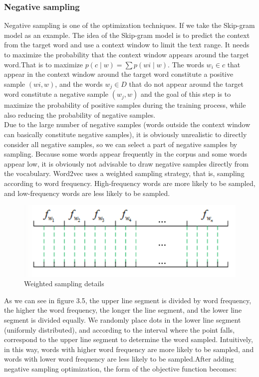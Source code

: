 \subsubsection{Negative sampling}

\noindent Negative sampling is one of the optimization techniques. If we take the Skip-gram model as an example. The idea of the Skip-gram model is to predict the context from the target word and use a context window to limit the text range. It needs to maximize the probability that the context window appears around the target word.That is to maximize $p(c∣w)=∑p(wi∣w)$. The words $w_i ∈ c$ that appear in the context window around the target word constitute a positive sample $(wi, w)$, and the words $w_j ∈ D$ that do not appear around the target word constitute a negative sample $(w_j, w)$ and the goal of this step is to maximize the probability of positive samples during the training process, while also reducing the probability of negative samples.\\

\noindent Due to the large number of negative samples (words outside the context window can basically constitute negative samples), it is obviously unrealistic to directly consider all negative samples, so we can select a part of negative samples by sampling. Because some words appear frequently in the corpus and some words appear low, it is obviously not advisable to draw negative samples directly from the vocabulary. Word2vec uses a weighted sampling strategy, that is, sampling according to word frequency. High-frequency words are more likely to be sampled, and low-frequency words are less likely to be sampled.\\

\begin{figure}[ht]

\centering
\includegraphics[scale=1.3]{images/image_largevis_word2vec_seperate_lines.PNG}
\caption{Weighted sampling details}
\label{fig:label}
\end{figure}

\noindent As we can see in figure 3.5, the upper line segment is divided by word frequency, the higher the word frequency, the longer the line segment, and the lower line segment is divided equally. We randomly place dots in the lower line segment (uniformly distributed), and according to the interval where the point falls, correspond to the upper line segment to determine the word sampled. Intuitively, in this way, words with higher word frequency are more likely to be sampled, and words with lower word frequency are less likely to be sampled.After adding negative sampling optimization, the form of the objective function becomes:

